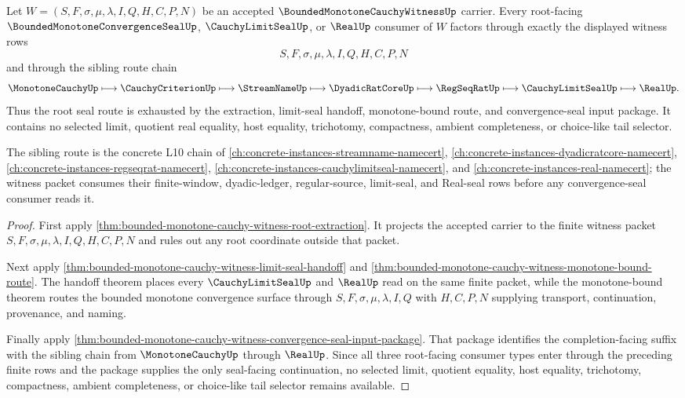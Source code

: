 \begin{theorem}
\label{thm:bounded-monotone-cauchy-witness-root-seal-route-exhaustion}
Let $W=(S,F,\sigma,\mu,\lambda,I,Q,H,C,P,N)$ be an accepted $\BoundedMonotoneCauchyWitnessUp$ carrier. Every root-facing $\BoundedMonotoneConvergenceSealUp$, $\CauchyLimitSealUp$, or $\RealUp$ consumer of $W$ factors through exactly the displayed witness rows
$$
S,F,\sigma,\mu,\lambda,I,Q,H,C,P,N
$$
and through the sibling route chain
$$
\MonotoneCauchyUp \longmapsto \CauchyCriterionUp \longmapsto \StreamNameUp \longmapsto \DyadicRatCoreUp \longmapsto \RegSeqRatUp \longmapsto \CauchyLimitSealUp \longmapsto \RealUp.
$$
Thus the root seal route is exhausted by the extraction, limit-seal handoff, monotone-bound route, and convergence-seal input package. It contains no selected limit, quotient real equality, host equality, trichotomy, compactness, ambient completeness, or choice-like tail selector.

The sibling route is the concrete L10 chain of \autoref{ch:concrete-instances-streamname-namecert}, \autoref{ch:concrete-instances-dyadicratcore-namecert}, \autoref{ch:concrete-instances-regseqrat-namecert}, \autoref{ch:concrete-instances-cauchylimitseal-namecert}, and \autoref{ch:concrete-instances-real-namecert}; the witness packet consumes their finite-window, dyadic-ledger, regular-source, limit-seal, and Real-seal rows before any convergence-seal consumer reads it.
\end{theorem}
\begin{proof}
First apply \autoref{thm:bounded-monotone-cauchy-witness-root-extraction}. It projects the accepted carrier to the finite witness packet $S,F,\sigma,\mu,\lambda,I,Q,H,C,P,N$ and rules out any root coordinate outside that packet.

Next apply \autoref{thm:bounded-monotone-cauchy-witness-limit-seal-handoff} and \autoref{thm:bounded-monotone-cauchy-witness-monotone-bound-route}. The handoff theorem places every $\CauchyLimitSealUp$ and $\RealUp$ read on the same finite packet, while the monotone-bound theorem routes the bounded monotone convergence surface through $S,F,\sigma,\mu,\lambda,I,Q$ with $H,C,P,N$ supplying transport, continuation, provenance, and naming.

Finally apply \autoref{thm:bounded-monotone-cauchy-witness-convergence-seal-input-package}. That package identifies the completion-facing suffix with the sibling chain from $\MonotoneCauchyUp$ through $\RealUp$. Since all three root-facing consumer types enter through the preceding finite rows and the package supplies the only seal-facing continuation, no selected limit, quotient equality, host equality, trichotomy, compactness, ambient completeness, or choice-like tail selector remains available.
\end{proof}

